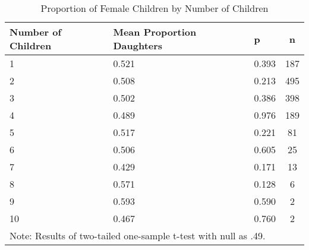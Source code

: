 \begin{table}[!htb]
\centering
\caption{Proportion of Female Children by Number of Children} 
\label{tab:balance_prop_female_nchild}
\begingroup\small
\begin{tabular}{lllc}
  \hline
Number of Children & Mean Proportion Daughters & p & n \\ 
  \hline
   1 & 0.521 & 0.393 &  187 \\ 
     2 & 0.508 & 0.213 &  495 \\ 
     3 & 0.502 & 0.386 &  398 \\ 
     4 & 0.489 & 0.976 &  189 \\ 
     5 & 0.517 & 0.221 &   81 \\ 
     6 & 0.506 & 0.605 &   25 \\ 
     7 & 0.429 & 0.171 &   13 \\ 
     8 & 0.571 & 0.128 &    6 \\ 
     9 & 0.593 & 0.590 &    2 \\ 
    10 & 0.467 & 0.760 &    2 \\ 
   \hline 
 \multicolumn{3}{l}{\scriptsize{Note: Results of two-tailed one-sample t-test with null as .49.}} \hline
\end{tabular}
\endgroup
\end{table}
